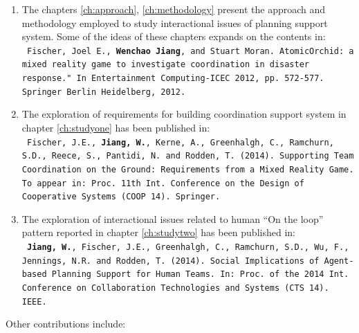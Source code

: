 \begin{enumerate}
\item The chapters \ref{ch:approach}, \ref{ch:methodology}  present the approach and methodology employed to study interactional issues of planning support system. Some of the ideas of these chapters expands on the contents in:\\
\texttt{ \footnotesize Fischer, Joel E., \textbf{Wenchao Jiang}, and Stuart Moran. AtomicOrchid: a mixed reality game to investigate coordination in disaster response." In Entertainment Computing-ICEC 2012, pp. 572-577. Springer Berlin Heidelberg, 2012.}\\

\item The exploration of requirements for building coordination support system in chapter \ref{ch:studyone}  has been published in:\\
\texttt{ \footnotesize Fischer, J.E., \textbf{Jiang, W.}, Kerne, A., Greenhalgh, C., Ramchurn, S.D., Reece, S., Pantidi, N. and Rodden, T. (2014). Supporting Team Coordination on the Ground: Requirements from a Mixed Reality Game. To appear in: Proc. 11th Int. Conference on the Design of Cooperative Systems (COOP 14). Springer.}\\


\item The exploration of interactional issues related to human ``On the loop'' pattern reported in chapter \ref{ch:studytwo} has been published in:\\
\texttt{ \footnotesize\textbf{Jiang, W.}, Fischer, J.E., Greenhalgh, C., Ramchurn, S.D., Wu, F., Jennings, N.R. and Rodden, T. (2014). Social Implications of Agent-based Planning Support for Human Teams.  In: Proc. of the 2014 Int. Conference on Collaboration Technologies and Systems (CTS 14). IEEE.}


\end{enumerate}

Other contributions include:

